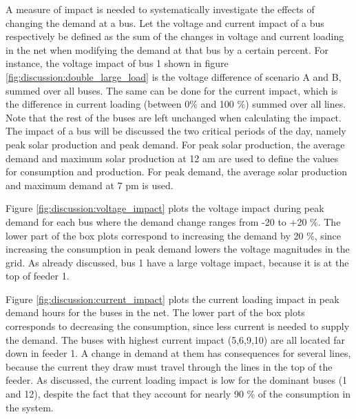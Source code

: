 \documentclass[class=book, crop=false]{standalone}
\begin{document}
A measure of impact is needed to systematically investigate the effects of changing the demand at a bus. Let the voltage and current impact of a bus respectively be defined as the sum of the changes in voltage and current loading in the net when modifying the demand at that bus by a certain percent. For instance, the voltage impact of bus 1 shown in figure \ref{fig:discussion:double_large_load} is the voltage difference of scenario A and B, summed over all buses. The same can be done for the current impact, which is the difference in current loading (between 0\% and 100 \%) summed over all lines. Note that the rest of the buses are left unchanged when calculating the impact. The impact of a bus will be discussed the two critical periods of the day, namely peak solar production and peak demand. For peak solar production, the average demand and maximum solar production at 12 am are used to define the values for consumption and production. For peak demand, the average solar production and maximum demand at 7 pm is used. 


Figure \ref{fig:discussion:voltage_impact} plots the voltage impact during peak demand for each bus where the demand change ranges from -20 to +20 \%. The lower part of the box plots correspond to increasing the demand by 20 \%, since increasing the consumption in peak demand lowers the voltage magnitudes in the grid. As already discussed, bus 1 have a large voltage impact, because it is at the top of feeder 1. 


Figure \ref{fig:discussion:current_impact} plots the current loading impact in peak demand hours for the buses in the net. The lower part of the box plots corresponds to decreasing the consumption, since less current is needed to supply the demand. The buses with highest current impact (5,6,9,10) are all located far down in feeder 1. A change in demand at them has consequences for several lines, because the current they draw must travel through the lines in the top of the feeder. As discussed, the current loading impact is low for the dominant buses (1 and 12), despite the fact that they account for nearly 90 \% of the consumption in the system. 
\end{document}
